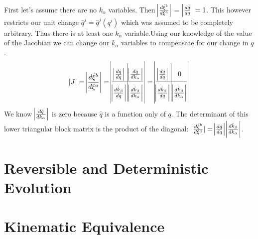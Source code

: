 \documentclass{article}
\begin{document}
	First let's assume there are no $k_\alpha$ variables. Then $\abs{\frac{d\hat{\xi}^b}{d\xi^a}}$ = $\abs{\frac{d\hat{q}}{dq}} = 1$. This however restricts our unit change $\hat{q}^j = \hat{q}^j(q^i)$ which was assumed to be completely arbitrary. Thus there is at least one $k_\alpha$ variable.Using our knowledge of the value of the Jacobian we can change our $k_\alpha$ variables to compensate for our change in $q$.
	\begin{equation}
	\label{}
	\abs{J} = \abs{\frac{d\hat{\xi}^b}{d\xi^a}} = \abs{ \arraycolsep=1.7pt\def\arraystretch{2.2}
	\begin{array}{@{}c|c@{}} \abs{\frac{d\hat{q}}{dq}} & \abs{\frac{d\hat{q}}{dk_\alpha}} \\
\hline \abs{\frac{d\hat{k}_\beta}{dq}} & \abs{\frac{d\hat{k}_\beta}{dk_\alpha}}
\end{array}	} = \abs{ \arraycolsep=1.7pt\def\arraystretch{2.2}
	\begin{array}{@{}c|c@{}} \abs{\frac{d\hat{q}}{dq}} & 0 \\
\hline \abs{\frac{d\hat{k}_\beta}{dq}} & \abs{\frac{d\hat{k}_\beta}{dk_\alpha}}
\end{array}	}
	\end{equation}
We know $\abs{\frac{d\hat{q}}{dk_\alpha}}$ is zero because $\hat{q}$ is a function only of $q$. The determinant of this lower triangular block matrix is the product of the diagonal: $|\frac{d\hat{\xi}^b}{d\xi^a}| = \abs{\frac{d\hat{q}}{dq}}\abs{\frac{d\hat{k}_\beta}{dk_\alpha}}$. 
	
\section{Reversible and Deterministic Evolution}

\section{Kinematic Equivalence}
\end{document}
